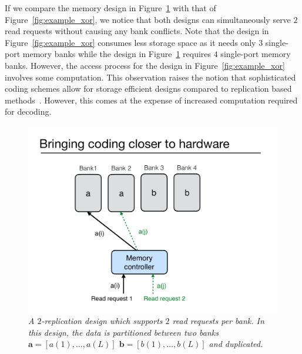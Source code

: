 \begin{remark}
\label{rem:read_only}
If we compare the memory design in Figure~\ref{fig:read_replication} with that of Figure~\ref{fig:example_xor}, we notice that both designs can simultaneously serve $2$ read requests without causing any bank conflicts. Note that the design in Figure~\ref{fig:example_xor} consumes less storage space as it needs only $3$ single-port memory banks while the design in  Figure~\ref{fig:read_replication} requires $4$ single-port memory banks. However, the access process for the design in Figure~\ref{fig:example_xor} involves some computation. This observation raises the notion that sophisticated coding schemes allow for storage efficient designs compared to replication based methods~\cite{MacSlo}. However, this comes at the expense of increased computation required for decoding.
\end{remark}

\begin{figure}[t!]
\centering
\includegraphics[width=0.425\linewidth]{fig/read-replication.pdf}
\caption{\it{A $2$-replication design which supports $2$ read requests per bank. In this design, the data is partitioned between two banks $\mathbf{a} = [a(1),\ldots, a(L)]$ $\mathbf{b} = [b(1),\ldots, b(L)]$ and duplicated.}}
\label{fig:read_replication}
\end{figure}

